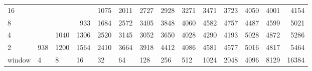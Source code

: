 \begin{table}[h]
{\begin{tabular}{lrrrrrrrrrrrrr}
			\multicolumn{1}{|l|}{16} &  &  &  & \cellcolor[HTML]{99E600}1075 & \cellcolor[HTML]{E69900}2011 & \cellcolor[HTML]{E60000}2727 & \cellcolor[HTML]{E60000}2928 & \cellcolor[HTML]{E60000}3271 & \cellcolor[HTML]{9900E6}3471 & \cellcolor[HTML]{9900E6}3723 & \cellcolor[HTML]{9900E6}4050 & \cellcolor[HTML]{9900E6}4001 & \cellcolor[HTML]{9900E6}4154 \\ \cline{1-1}
			\multicolumn{1}{|l|}{8} &  &  & \cellcolor[HTML]{99E600}933 & \cellcolor[HTML]{E69900}1684 & \cellcolor[HTML]{E60000}2572 & \cellcolor[HTML]{9900E6}3405 & \cellcolor[HTML]{9900E6}3848 & \cellcolor[HTML]{9900E6}4060 & \cellcolor[HTML]{4C00E6}4582 & \cellcolor[HTML]{4C00E6}4757 & \cellcolor[HTML]{4C00E6}4487 & \cellcolor[HTML]{4C00E6}4599 & \cellcolor[HTML]{4C00E6}5021 \\ \cline{1-1}
			\multicolumn{1}{|l|}{4} &  & \cellcolor[HTML]{99E600}1040 & \cellcolor[HTML]{E69900}1306 & \cellcolor[HTML]{E60000}2520 & \cellcolor[HTML]{E60000}3145 & \cellcolor[HTML]{E60000}3052 & \cellcolor[HTML]{9900E6}3650 & \cellcolor[HTML]{9900E6}4028 & \cellcolor[HTML]{9900E6}4290 & \cellcolor[HTML]{9900E6}4193 & \cellcolor[HTML]{4C00E6}5028 & \cellcolor[HTML]{4C00E6}4872 & \cellcolor[HTML]{4C00E6}5286 \\ \cline{1-1}
			\multicolumn{1}{|l|}{2} & \cellcolor[HTML]{99E600}938 & \cellcolor[HTML]{99E600}1200 & \cellcolor[HTML]{E69900}1564 & \cellcolor[HTML]{E60000}2410 & \cellcolor[HTML]{9900E6}3664 & \cellcolor[HTML]{9900E6}3918 & \cellcolor[HTML]{9900E6}4412 & \cellcolor[HTML]{9900E6}4086 & \cellcolor[HTML]{4C00E6}4581 & \cellcolor[HTML]{4C00E6}4577 & \cellcolor[HTML]{4C00E6}5016 & \cellcolor[HTML]{4C00E6}4817 & \cellcolor[HTML]{4C00E6}5464 \\ \cline{1-1}
			\multicolumn{1}{l|}{window} & \multicolumn{1}{l|}{4} & \multicolumn{1}{l|}{8} & \multicolumn{1}{l|}{16} & \multicolumn{1}{l|}{32} & \multicolumn{1}{l|}{64} & \multicolumn{1}{l|}{128} & \multicolumn{1}{l|}{256} & \multicolumn{1}{l|}{512} & \multicolumn{1}{l|}{1024} & \multicolumn{1}{l|}{2048} & \multicolumn{1}{l|}{4096} & \multicolumn{1}{l|}{8129} & \multicolumn{1}{l|}{16384} \\ \cline{2-14}
		\end{tabular}
	}
\end{table}


